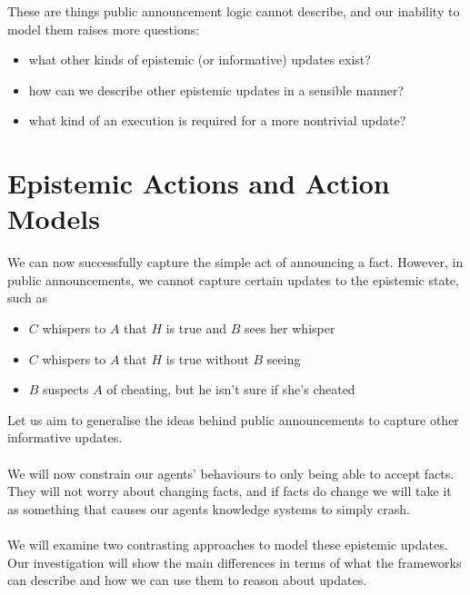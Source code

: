 \documentclass[12pt, a4paper, titlepage]{scrartcl}
\begin{document}
These are things public announcement logic cannot describe, and our inability to
model them raises more questions:
\begin{itemize}
	\item what other kinds of epistemic (or informative) updates exist?
	\item how can we describe other epistemic updates in a sensible manner?
	\item what kind of an execution is required for a more nontrivial update?
\end{itemize}

\section{Epistemic Actions and Action Models} \label{estAct}
We can now successfully capture the simple act of announcing a fact.
However, in public announcements, we cannot capture certain updates to the
epistemic state, such as
\begin{itemize} 
  \item $C$ whispers to $A$ that $H$ is true and $B$ sees her whisper
  \item $C$ whispers to $A$ that $H$ is true without $B$ seeing
  \item $B$ suspects $A$ of cheating, but he isn't sure if she's cheated
\end{itemize}
Let us aim to generalise the ideas behind public announcements to capture other
informative updates.\\
\\
We will now constrain our agents' behaviours to only being able to accept facts.
They will not worry about changing facts, and if facts do change we will take it
as something that causes our agents knowledge systems to simply crash.\\
\\
We will examine two contrasting approaches to model these epistemic updates.
Our investigation will show the main differences in terms of what the frameworks
can describe and how we can use them to reason about updates.
\end{document}
